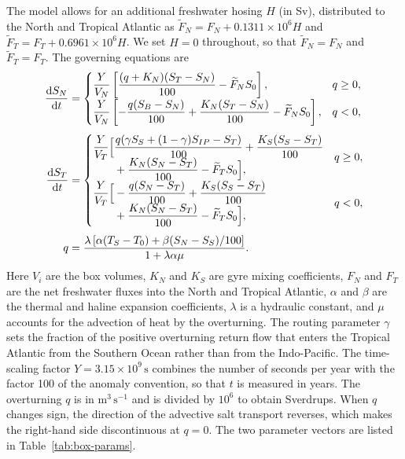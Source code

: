 \documentclass[12pt, a4paper]{article}
\newcommand{\dint}{\mathrm{d}}
\begin{document}
The model allows for an additional freshwater hosing $H$ (in Sv), distributed to the North and Tropical Atlantic as $\widetilde F_N=F_N+0.1311\times10^6H$ and $\widetilde F_T=F_T+0.6961\times10^6H$. We set $H=0$ throughout, so that $\widetilde F_N=F_N$ and $\widetilde F_T=F_T$. The governing equations are
\begin{align}
\frac{\dint S_N}{\dint t}
&=\begin{cases}
\dfrac{Y}{V_N}\left[\dfrac{(q+K_N)(S_T-S_N)}{100}-\widetilde F_NS_0\right], & q\geq0,\\[6pt]
\dfrac{Y}{V_N}\left[-\dfrac{q(S_B-S_N)}{100}+\dfrac{K_N(S_T-S_N)}{100}-\widetilde F_NS_0\right], & q<0,
\end{cases}
\label{eq: dS_N}\\[4pt]
\frac{\dint S_T}{\dint t}
&=\begin{cases}
\begin{aligned}
\dfrac{Y}{V_T}\Bigl[&\dfrac{q(\gamma S_S+(1-\gamma)S_{IP}-S_T)}{100}+\dfrac{K_S(S_S-S_T)}{100}\\[-2pt]
&+\dfrac{K_N(S_N-S_T)}{100}-\widetilde F_TS_0\Bigr],
\end{aligned} & q\geq0,\\[10pt]
\begin{aligned}
\dfrac{Y}{V_T}\Bigl[&-\dfrac{q(S_N-S_T)}{100}+\dfrac{K_S(S_S-S_T)}{100}\\[-2pt]
&+\dfrac{K_N(S_N-S_T)}{100}-\widetilde F_TS_0\Bigr],
\end{aligned} & q<0,
\end{cases}
\label{eq: dS_T}\\[4pt]
q&=\frac{\lambda\left[\alpha(T_S-T_0)+\beta(S_N-S_S)/100\right]}{1+\lambda\alpha\mu}.
\label{eq: q}
\end{align}
Here $V_i$ are the box volumes, $K_N$ and $K_S$ are gyre mixing coefficients, $F_N$ and $F_T$ are the net freshwater fluxes into the North and Tropical Atlantic, $\alpha$ and $\beta$ are the thermal and haline expansion coefficients, $\lambda$ is a hydraulic constant, and $\mu$ accounts for the advection of heat by the overturning. The routing parameter $\gamma$ sets the fraction of the positive overturning return flow that enters the Tropical Atlantic from the Southern Ocean rather than from the Indo-Pacific. The time-scaling factor $Y=3.15\times10^9\,\text{s}$ combines the number of seconds per year with the factor 100 of the anomaly convention, so that $t$ is measured in years. The overturning $q$ is in $\text{m}^3\,\text{s}^{-1}$ and is divided by $10^6$ to obtain Sverdrups. When $q$ changes sign, the direction of the advective salt transport reverses, which makes the right-hand side discontinuous at $q=0$. The two parameter vectors are listed in Table~\ref{tab:box-params}.
\end{document}
